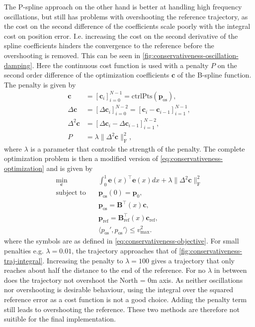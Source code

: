 The P-spline approach on the other hand is better at handling high frequency oscillations, but still has problems with overshooting the reference trajectory, as the cost on the second difference of the coefficients scale poorly with the integral cost on position error. I.e. increasing the cost on the second derivative of the spline coefficients hinders the convergence to the reference before the overshooting is removed. This can be seen in \cref{fig:conservativeness-oscillation-damping}. Here the continuous cost function is used with a penalty $P$ on the second order difference of the optimization coefficients $\mathbf c$ of the B-spline function. The penalty is given by
\begin{equation}\label{eq:conservativeness-oscillation-damping}
    \begin{aligned}
        \mathbf c &= [\mathbf c_i]_{i=0}^{N-1} =
        \text{ctrlPts}\left(\mathbf{p}_\text{os}\right), \\
        \Delta \mathbf c &= [\Delta\mathbf c_i]_{i=0}^{N-2} =
        [\mathbf c_i - \mathbf c_{i-1}]_{i=1}^{N-1}, \\
        \Delta^2 \mathbf c &= [\Delta \mathbf c_i - \Delta \mathbf c_{i-1}]_{i=1}^{N-2}, \\
        P &= \lambda \|\Delta^2 \mathbf c\|_\text{F}^2,
    \end{aligned}
\end{equation}
where $\lambda$ is a parameter that controls the strength of the penalty. The complete optimization problem is then a modified version of \cref{eq:conservativeness-optimization} and is given by
\begin{equation}\label{eq:conservativeness-optimization-penalty}
    \begin{aligned}
        \min_{\mathbf c} \quad & \int_0^1 \mathbf e(x)^\top \mathbf e(x) dx + \lambda \|\Delta^2 \mathbf c\|_\text{F}^2 \\
        \text{subject to} \quad &\mathbf p_\text{os}(0) = \mathbf p_0, \\
                     &\mathbf p_\text{os} = \mathbf B^\top(x) \mathbf c, \\
                     &\mathbf p_\text{ref} = \mathbf B_\text{ref}^\top(x) \mathbf c_\text{ref}, \\
                     &\langle p_\text{os}', p_\text{os}' \rangle \le v_\text{max}^2.
    \end{aligned}
\end{equation}
where the symbols are as defined in \cref{eq:conservativeness-objective}.
For small penalties e.g. $\lambda=0.01$, the trajectory approaches that of \cref{fig:conservativeness-traj-integral}. Increasing the penalty to $\lambda=100$ gives a trajectory that only reaches about half the distance to the end of the reference. For no $\lambda$ in between does the trajectory not overshoot the North = 0m axis. As neither oscillations nor overshooting is desirable behaviour, using the integral over the squared reference error as a cost function is not a good choice. Adding the penalty term still leads to overshooting the reference. These two methods are therefore not suitible for the final implementation.

